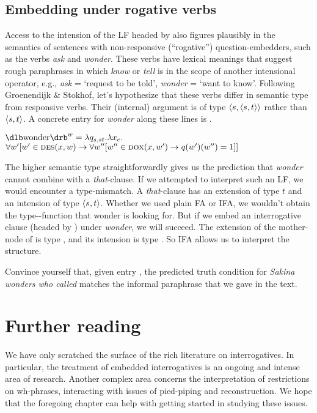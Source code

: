\subsection{Embedding under rogative verbs}
\label{sec:embedding-rogative}

Access to the intension of the LF headed by \ans also figures plausibly in the
semantics of sentences with non-responsive (``rogative'') question-embedders,
such as the verbs \emph{ask} and \emph{wonder}. These verbs have lexical
meanings that suggest rough paraphrases in which \emph{know} or \emph{tell} is
in the scope of another intensional operator, e.g., \emph{ask} = `request to be
told', \emph{wonder} = `want to know'. Following Groenendijk \& Stokhof, let's
hypothesize that these verbs differ in semantic type from responsive verbs.
Their (internal) argument is of type $\langle s,\langle s,t \rangle \rangle$ rather than
$\langle s,t \rangle$. A concrete entry for \emph{wonder} along these lines is \Next.

\ex
$\svt{wonder}^{w} = \lambda q_{s,st}.\lambda x_{e}.$\\
\hfill$\forall w' [w'\in\textsc{des}(x,w) \rightarrow \forall w'' [w''\in\textsc{dox}(x,w') \rightarrow q(w')(w'')=1]]$
\xe

The higher semantic type straightforwardly gives us the prediction that
\emph{wonder} cannot combine with a \emph{that}-clause. If we attempted to
interpret such an LF, we would encounter a type-mismatch. A \emph{that}-clause
has an extension of type $t$ and an intension of type $\langle s,t \rangle$. Whether we
used plain FA or IFA, we wouldn't obtain the type--function that
wonder is looking for. But if we embed an interrogative clause (headed by \ans)
under \emph{wonder}, we will succeed. The extension of the mother-node of \ans
is type , and its intension is type . So IFA allows us to
interpret the structure.

\begin{exercise}
  Convince yourself that, given entry \Last, the predicted truth condition for
  \emph{Sakina wonders who called} matches the informal paraphrase that we gave
  in the text.
\end{exercise}

\section{Further reading}

We have only scratched the surface of the rich literature on interrogatives. In
particular, the treatment of embedded interrogatives is an ongoing and intense
area of research. Another complex area concerns the interpretation of
restrictions on wh-phrases, interacting with issues of pied-piping and
reconstruction. We hope that the foregoing chapter can help with getting started
in studying these issues.





